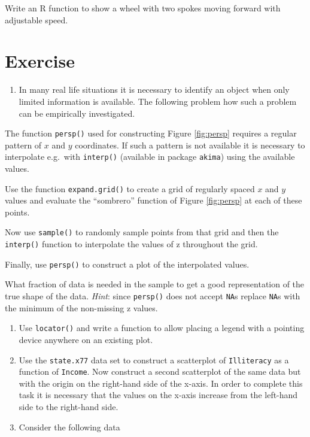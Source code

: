 \documentclass[
]{book}
\providecommand{\tightlist}{%
  \setlength{\itemsep}{0pt}\setlength{\parskip}{0pt}}
\begin{document}
Write an R function to show a wheel with two spokes moving forward with adjustable speed.

\section{Exercise}\label{Ex10}

\begin{enumerate}
\def\labelenumi{(\arabic{enumi})}
\tightlist
\item
  In many real life situations it is necessary to identify an object when only limited information is available. The following problem how such a problem can be empirically investigated.
\end{enumerate}

The function \texttt{persp()} used for constructing Figure \ref{fig:persp} requires a regular pattern of \(x\) and \(y\) coordinates. If such a pattern is not available it is necessary to interpolate e.g.~with \texttt{interp()} (available in package \texttt{akima}) using the available values.

Use the function \texttt{expand.grid()} to create a grid of regularly spaced \(x\) and \(y\) values and evaluate the ``sombrero'' function of Figure \ref{fig:persp} at each of these points.

Now use \texttt{sample()} to randomly sample points from that grid and then the \texttt{interp()} function to interpolate the values of z throughout the grid.

Finally, use \texttt{persp()} to construct a plot of the interpolated values.

What fraction of data is needed in the sample to get a good representation of the true shape of the data. \emph{Hint}: since \texttt{persp()} does not accept \texttt{NA}s replace \texttt{NA}s with the minimum of the non-missing z values.

\begin{enumerate}
\def\labelenumi{(\arabic{enumi})}
\setcounter{enumi}{1}
\item
  Use \texttt{locator()} and write a function to allow placing a legend with a pointing device anywhere on an existing plot.
\item
  Use the \texttt{state.x77} data set to construct a scatterplot of \texttt{Illiteracy} as a function of \texttt{Income}. Now construct a second scatterplot of the same data but with the origin on the right-hand side of the x-axis. In order to complete this task it is necessary that the values on the x-axis increase from the left-hand side to the right-hand side.
\item
  Consider the following data
\end{enumerate}
\end{document}
